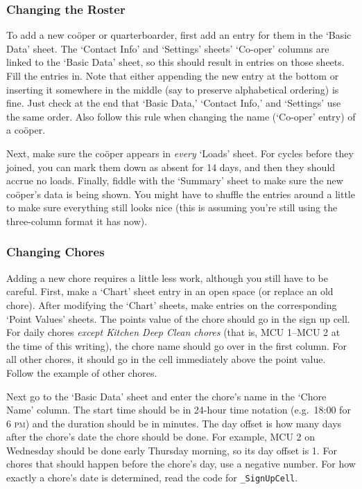 \documentclass{article}
\begin{document}
\subsubsection{Changing the Roster}
To add a new co\"{o}per or quarterboarder, first add an entry for them in the `Basic Data' sheet.
The `Contact Info' and `Settings' sheets' `Co-oper' columns are linked to the `Basic Data' sheet, so this should result in entries on those sheets.
Fill the entries in.
Note that either appending the new entry at the bottom or inserting it somewhere in the middle (say to preserve alphabetical ordering) is fine.
Just check at the end that `Basic Data,' `Contact Info,' and `Settings' use the same order.
Also follow this rule when changing the name (`Co-oper' entry) of a co\"{o}per.

Next, make sure the co\"{o}per appears in \emph{every} `Loads' sheet.
For cycles before they joined, you can mark them down as absent for 14 days, and then they should accrue no loads.
Finally, fiddle with the `Summary' sheet to make sure the new co\"{o}per's data is being shown.
You might have to shuffle the entries around a little to make sure everything still looks nice (this is assuming you’re still using the three-column format it has now).

\subsubsection{Changing Chores}
Adding a new chore requires a little less work, although you still have to be careful.
First, make a `Chart' sheet entry in an open space (or replace an old chore).
After modifying the `Chart' sheets, make entries on the corresponding `Point Values' sheets.
The points value of the chore should go in the sign up cell.
For daily chores \emph{except Kitchen Deep Clean chores} (that is, MCU 1--MCU 2 at the time of this writing), the chore name should go over in the first column.
For all other chores, it should go in the cell immediately above the point value.
Follow the example of other chores.

Next go to the `Basic Data' sheet and enter the chore's name in the `Chore Name' column.
The start time should be in 24-hour time notation (e.g.~18:00 for 6 {\scshape pm}) and the duration should be in minutes.
The day offset is how many days after the chore's date the chore should be done.
For example, MCU 2 on Wednesday should be done early Thursday morning, so its day offset is 1.
For chores that should happen before the chore's day, use a negative number.
For how exactly a chore's date is determined, read the code for \texttt{\_SignUpCell}.
\end{document}
